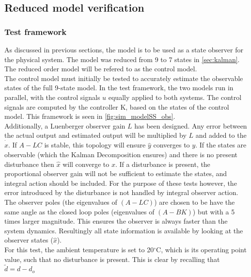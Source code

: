 \subsection{Reduced model verification}
\subsubsection{Test framework}
As discussed in previous sections, the model is to be used as a state observer for the physical system. The model was reduced from 9 to 7 states in \cref{sec:kalman}. The reduced order model will be refered to as the control model. \\

The control model must initially be tested to accurately estimate the observable states of the full 9-state model. In the test framework, the two models run in parallel, with the control signals $u$ equally applied to both systems. The control signals are computed by the controller K, based on the states of the control model. This framework is seen in \cref{fig:sim_modelSS_obs}. \\

Additionally, a Luenberger observer gain $L$ has been designed. Any error between the actual output and estimated output will be multiplied by $L$ and added to the $\dot{\hat{x}}$. If $A-LC$ is stable, this topology will ensure $\hat{y}$ converges to $y$. If the states are observable (which the Kalman Decomposition ensures) and there is no present disturbance then $\hat{x}$ will converge to $x$. If a disturbance is present, the proportional observer gain will not be sufficient to estimate the states, and integral action should be included. For the purpose of these tests however, the error introduced by the disturbance is not handled by integral observer action. \\

The observer poles (the eigenvalues of $(A-LC)$) are chosen to be have the same angle as the closed loop poles (eigenvalues of $(A-BK)$) but with a 5 times larger magnitude. This ensures the observer is always faster than the system dynamics. Resultingly all state information is available by looking at the observer states ($\hat{x}$).\\

For this test, the ambient temperature is set to 20$^{\circ}$C, which is its operating point value, such that no disturbance is present. This is clear by recalling that $\tilde{d} = d-d_o$

